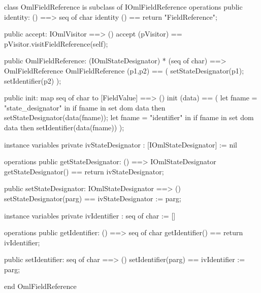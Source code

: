 \begin{vdm_al}
class OmlFieldReference is subclass of IOmlFieldReference
operations
  public identity: () ==> seq of char
  identity () == return "FieldReference";

  public accept: IOmlVisitor ==> ()
  accept (pVisitor) == pVisitor.visitFieldReference(self);

  public OmlFieldReference:
      (IOmlStateDesignator) *
      (seq of char) ==> OmlFieldReference
  OmlFieldReference (p1,p2) == 
   ( setStateDesignator(p1);
     setIdentifier(p2) );

  public init: map seq of char to [FieldValue] ==> ()
  init (data) ==
    ( let fname = "state_designator" in
        if fname in set dom data
        then setStateDesignator(data(fname));
      let fname = "identifier" in
        if fname in set dom data
        then setIdentifier(data(fname)) );

instance variables
  private ivStateDesignator : [IOmlStateDesignator] := nil

operations
  public getStateDesignator: () ==> IOmlStateDesignator
  getStateDesignator() == return ivStateDesignator;

  public setStateDesignator: IOmlStateDesignator ==> ()
  setStateDesignator(parg) == ivStateDesignator := parg;

instance variables
  private ivIdentifier : seq of char := []

operations
  public getIdentifier: () ==> seq of char
  getIdentifier() == return ivIdentifier;

  public setIdentifier: seq of char ==> ()
  setIdentifier(parg) == ivIdentifier := parg;

end OmlFieldReference
\end{vdm_al}

